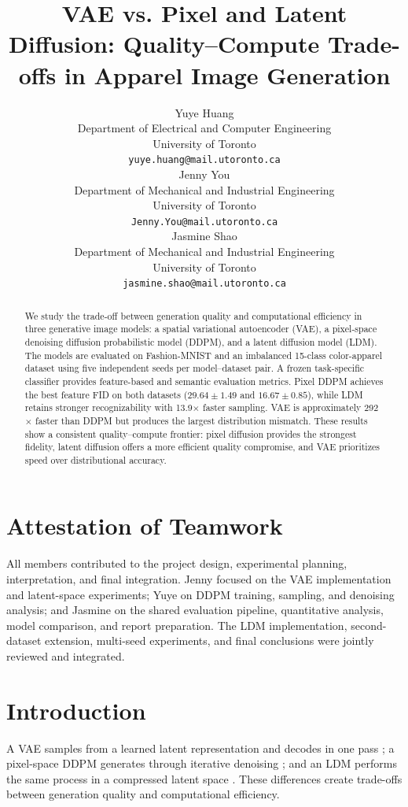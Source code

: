 \documentclass{article}
\title{VAE vs. Pixel and Latent Diffusion: Quality–Compute Trade-offs in Apparel Image Generation}
\author{%
  Yuye Huang\\
  Department of Electrical and Computer Engineering\\
  University of Toronto\\
  \texttt{yuye.huang@mail.utoronto.ca} \\
  \And
  Jenny You\\
  Department of Mechanical and Industrial Engineering\\
  University of Toronto\\
  \texttt{Jenny.You@mail.utoronto.ca} \\
  \And
  Jasmine Shao\\
  Department of Mechanical and Industrial Engineering\\
  University of Toronto\\
  \texttt{jasmine.shao@mail.utoronto.ca} \\
}
\begin{document}
\maketitle

\begin{abstract}
We study the trade-off between generation quality and computational efficiency in three generative image models: a spatial variational autoencoder (VAE), a pixel-space denoising diffusion probabilistic model (DDPM), and a latent diffusion model (LDM). The models are evaluated on Fashion-MNIST and an imbalanced 15-class color-apparel dataset using five independent seeds per model--dataset pair. A frozen task-specific classifier provides feature-based and semantic evaluation metrics. Pixel DDPM achieves the best feature FID on both datasets ($29.64\pm1.49$ and $16.67\pm0.85$), while LDM retains stronger recognizability with 13.9$\times$ faster sampling. VAE is approximately 292$\times$ faster than DDPM but produces the largest distribution mismatch. These results show a consistent quality--compute frontier: pixel diffusion provides the strongest fidelity, latent diffusion offers a more efficient quality compromise, and VAE prioritizes speed over distributional accuracy.
\end{abstract}

\section*{Attestation of Teamwork}
All members contributed to the project design, experimental planning, interpretation, and final integration. Jenny focused on the VAE implementation and latent-space experiments; Yuye on DDPM training, sampling, and denoising analysis; and Jasmine on the shared evaluation pipeline, quantitative analysis, model comparison, and report preparation. The LDM implementation, second-dataset extension, multi-seed experiments, and final conclusions were jointly reviewed and integrated.

\section{Introduction} 

A VAE samples from a learned latent representation and decodes in one pass \citep{kingma2014vae}; a pixel-space DDPM generates through iterative denoising \citep{ho2020ddpm}; and an LDM performs the same process in a compressed latent space \citep{rombach2022ldm}. These differences create trade-offs between generation quality and computational efficiency. 
\end{document}

